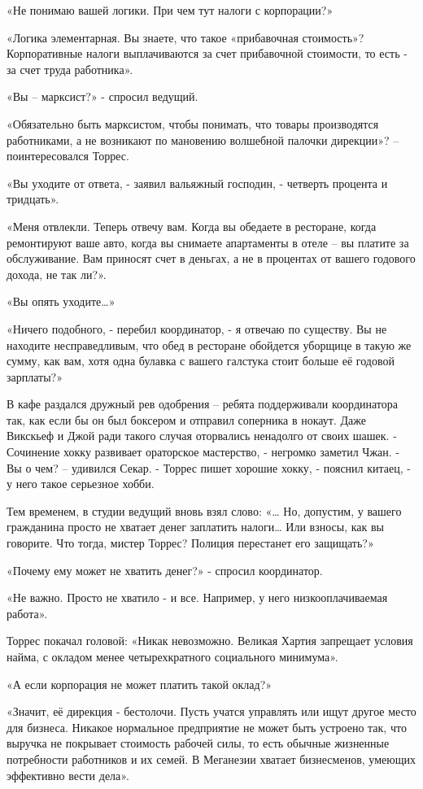 \documentclass{book}
\begin{document}
«Не понимаю вашей логики. При чем тут налоги с корпорации?»

«Логика элементарная. Вы знаете, что такое «прибавочная стоимость»? Корпоративные налоги выплачиваются за счет прибавочной стоимости, то есть - за счет труда работника».

«Вы -- марксист?» - спросил ведущий.

«Обязательно быть марксистом, чтобы понимать, что товары производятся работниками, а не возникают по мановению волшебной палочки дирекции»? -- поинтересовался Торрес.

«Вы уходите от ответа, - заявил вальяжный господин, - четверть процента и тридцать».

«Меня отвлекли. Теперь отвечу вам. Когда вы обедаете в ресторане, когда ремонтируют ваше авто, когда вы снимаете апартаменты в отеле -- вы платите за обслуживание. Вам приносят счет в деньгах, а не в процентах от вашего годового дохода, не так ли?».

«Вы опять уходите\ldots{}»

«Ничего подобного, - перебил координатор, - я отвечаю по существу. Вы не находите несправедливым, что обед в ресторане обойдется уборщице в такую же сумму, как вам, хотя одна булавка с вашего галстука стоит больше её годовой зарплаты?»

В кафе раздался дружный рев одобрения -- ребята поддерживали координатора так, как если бы он был боксером и отправил соперника в нокаут. Даже Викскьеф и Джой ради такого случая оторвались ненадолго от своих шашек.
- Сочинение хокку развивает ораторское мастерство, - негромко заметил Чжан.
- Вы о чем? -- удивился Секар.
- Торрес пишет хорошие хокку, - пояснил китаец, - у него такое серьезное хобби.

Тем временем, в студии ведущий вновь взял слово:
«\ldots{} Но, допустим, у вашего гражданина просто не хватает денег заплатить налоги\ldots{} Или взносы, как вы говорите. Что тогда, мистер Торрес? Полиция перестанет его защищать?»

«Почему ему может не хватить денег?» - спросил координатор.

«Не важно. Просто не хватило - и все. Например, у него низкооплачиваемая работа».

Торрес покачал головой: «Никак невозможно. Великая Хартия запрещает условия найма, с окладом менее четырехкратного социального минимума».

«А если корпорация не может платить такой оклад?»

«Значит, её дирекция - бестолочи. Пусть учатся управлять или ищут другое место для бизнеса. Никакое нормальное предприятие не может быть устроено так, что выручка не покрывает стоимость рабочей силы, то есть обычные жизненные потребности работников и их семей. В Меганезии хватает бизнесменов, умеющих эффективно вести дела».
\end{document}
